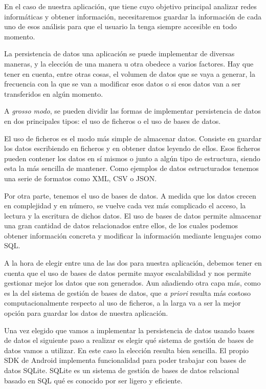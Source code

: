 En el caso de nuestra aplicación, que tiene cuyo objetivo principal analizar redes informáticas y obtener información, necesitaremos guardar la información de cada uno de esos análisis para que el usuario la tenga siempre accesible en todo momento.

La persistencia de datos una aplicación se puede implementar de diversas maneras, y la elección de una manera u otra obedece a varios factores. Hay que tener en cuenta, entre otras cosas, el volumen de datos que se vaya a generar, la frecuencia con la que se van a modificar esos datos o si esos datos van a ser transferidos en algún momento.

A \textit{grosso modo}, se pueden dividir las formas de implementar persistencia de datos en dos principales tipos: el uso de ficheros o el uso de bases de datos.

El uso de ficheros es el modo más simple de almacenar datos. Consiste en guardar los datos escribiendo en ficheros y en obtener datos leyendo de ellos. Esos ficheros pueden contener los datos en sí mismos o junto a algún tipo de estructura, siendo esta la más sencilla de mantener. Como ejemplos de datos estructurados tenemos una serie de formatos como XML, CSV o JSON.

Por otra parte, tenemos el uso de bases de datos. A medida que los datos crecen en complejidad y en número, se vuelve cada vez más complicado el acceso, la lectura y la escritura de dichos datos. El uso de bases de datos permite almacenar una gran cantidad de datos relacionados entre ellos, de los cuales podemos obtener información concreta y modificar la información mediante lenguajes como SQL.

A la hora de elegir entre una de las dos para nuestra aplicación, debemos tener en cuenta que el uso de bases de datos permite mayor escalabilidad y nos permite gestionar mejor los datos que son generados. Aun añadiendo otra capa más, como es la del sistema de gestión de bases de datos, que \textit{a priori} resulta más costoso computacionalmente respecto al uso de ficheros, a la larga va a ser la mejor opción para guardar los datos de nuestra aplicación.

Una vez elegido que vamos a implementar la persistencia de datos usando bases de datos el siguiente paso a realizar es  elegir qué sistema de gestión de bases de datos vamos a utilizar. En este caso la elección resulta bien sencilla. El propio SDK de Android implementa funcionalidad para poder trabajar con bases de datos SQLite. SQLite es un sistema de gestión de bases de datos relacional basado en SQL qué es conocido por ser ligero y eficiente.

